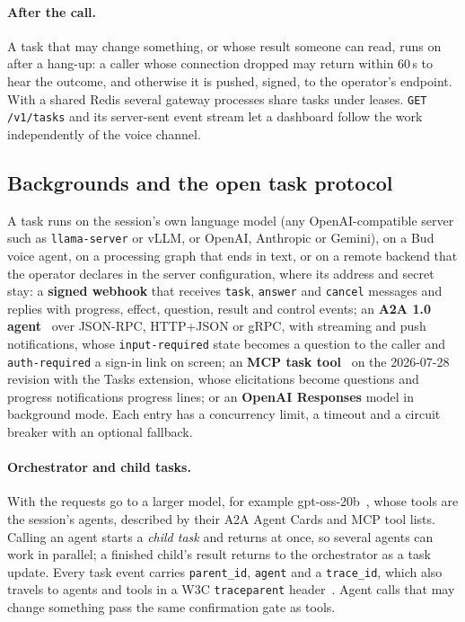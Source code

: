 \paragraph{After the call.}
A task that may change something, or whose result someone can read, runs on after a hang-up: a caller whose connection
dropped may return within 60\,s to hear the outcome, and otherwise it is pushed, signed, to the operator's endpoint.
With a shared Redis several gateway processes share tasks under leases. \texttt{GET /v1/tasks} and its server-sent event
stream let a dashboard follow the work independently of the voice channel.

\subsection{Backgrounds and the open task protocol}\label{sec:sys-backgrounds}

A task runs on the session's own language model (any OpenAI-compatible server such as \texttt{llama-server} or vLLM, or
OpenAI, Anthropic or Gemini), on a Bud voice agent, on a processing graph that ends in text, or on a remote backend that the
operator declares in the server configuration, where its address and secret stay: a \textbf{signed webhook} that receives
\texttt{task}, \texttt{answer} and \texttt{cancel} messages and replies with progress, effect, question, result and control
events; an \textbf{A2A 1.0 agent}~\citep{a2a_spec} over JSON-RPC, HTTP+JSON or gRPC, with streaming and push notifications,
whose \texttt{input-required} state becomes a question to the caller and \texttt{auth-required} a sign-in link on screen; an
\textbf{MCP task tool}~\citep{mcp_spec} on the 2026-07-28 revision with the Tasks extension, whose elicitations become
questions and progress notifications progress lines; or an \textbf{OpenAI Responses} model in background mode. Each entry has
a concurrency limit, a timeout and a circuit breaker with an optional fallback.

\paragraph{Orchestrator and child tasks.}
With  the requests go to a larger model, for example gpt-oss-20b~\citep{openai2025gptoss}, whose tools
are the session's agents, described by their A2A Agent Cards and MCP tool lists. Calling an agent starts a \emph{child task}
and returns at once, so several agents can work in parallel; a finished child's result returns to the orchestrator as a task
update. Every task event carries \texttt{parent\_id}, \texttt{agent} and a \texttt{trace\_id}, which also travels to agents
and tools in a W3C \texttt{traceparent} header~\citep{w3c_tracecontext}. Agent calls that may change something pass the same
confirmation gate as tools.

